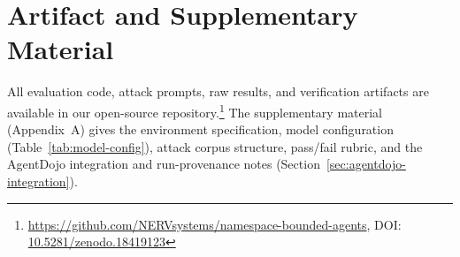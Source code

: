 \documentclass[acmsmall,screen,review]{acmart}
\begin{document}
\section*{Artifact and Supplementary Material}
All evaluation code, attack prompts, raw results, and verification artifacts are available in our open-source repository.\footnote{\url{https://github.com/NERVsystems/namespace-bounded-agents}, DOI: \href{https://doi.org/10.5281/zenodo.18419123}{10.5281/zenodo.18419123}} The supplementary material (Appendix~A) gives the environment specification, model configuration (Table~\ref{tab:model-config}), attack corpus structure, pass/fail rubric, and the AgentDojo integration and run-provenance notes (Section~\ref{sec:agentdojo-integration}).
\end{document}
